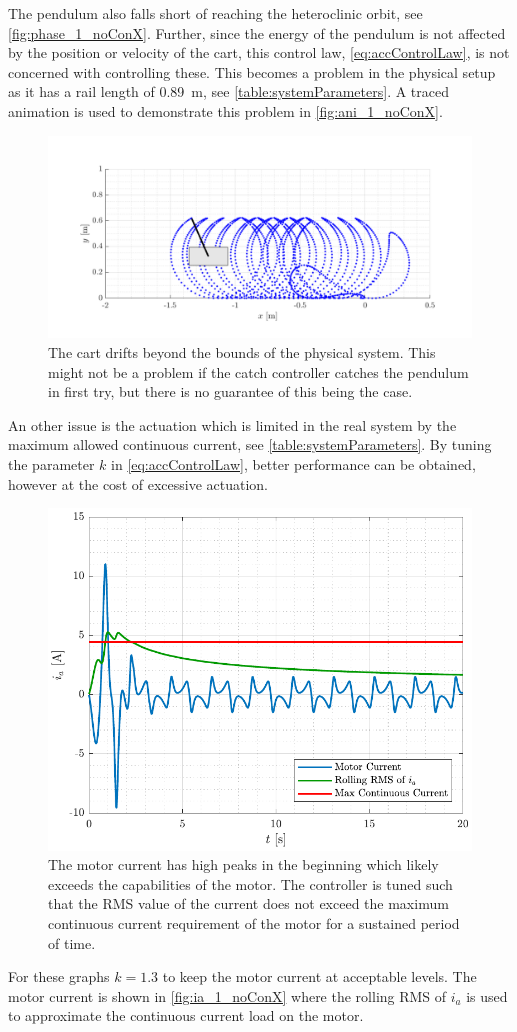%
The pendulum also falls short of reaching the heteroclinic orbit, see \autoref{fig:phase_1_noConX}.
Further, since the energy of the pendulum is not affected by the position or velocity of the cart, this control law, \autoref{eq:accControlLaw}, is not concerned with controlling these. This becomes a problem in the physical setup as it has a rail length of \SI{0.89}{m}, see \autoref{table:systemParameters}. A traced animation is used to demonstrate this problem in \autoref{fig:ani_1_noConX}.
\begin{figure}[H]
  \includegraphics[width=.7\textwidth]{figures/ani_1_noConX}
  \caption{The cart drifts beyond the bounds of the physical system. This might not be a problem if the catch controller catches the pendulum in first try, but there is no guarantee of this being the case.}
  \label{fig:ani_1_noConX}
\end{figure}
%
An other issue is the actuation which is limited in the real system by the maximum allowed continuous current, see \autoref{table:systemParameters}. By tuning the parameter $k$ in \autoref{eq:accControlLaw}, better performance can be obtained, however at the cost of excessive actuation.
%
\begin{figure}[H]
  \includegraphics[width=.52\textwidth]{figures/ia_1_noConX}
  \caption{The motor current has high peaks in the beginning which likely exceeds the capabilities of the motor. The controller is tuned such that the RMS value of the current does not exceed the maximum continuous current requirement of the motor for a sustained period of time.}
  \label{fig:ia_1_noConX}
\end{figure}
%
For these graphs $k=1.3$ to keep the motor current at acceptable levels. The motor current is shown in \autoref{fig:ia_1_noConX} where the rolling RMS of $i_a$ is used to approximate the continuous current load on the motor.

